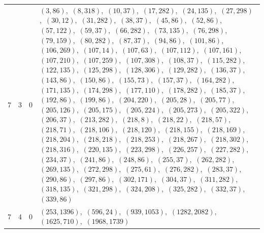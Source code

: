 \documentclass[11pt]{article}
\begin{document}
\begin{longtable}{@{}rrl>{\raggedright\arraybackslash}p{}@{}}
7 & 3 & $0$ & $(3,86)$,\allowbreak\ $(8,318)$,\allowbreak\ $(10,37)$,\allowbreak\ $(17,282)$,\allowbreak\ $(24,135)$,\allowbreak\ $(27,298)$,\allowbreak\ $(30,12)$,\allowbreak\ $(31,282)$,\allowbreak\ $(38,37)$,\allowbreak\ $(45,86)$,\allowbreak\ $(52,86)$,\allowbreak\ $(57,122)$,\allowbreak\ $(59,37)$,\allowbreak\ $(66,282)$,\allowbreak\ $(73,135)$,\allowbreak\ $(76,298)$,\allowbreak\ $(79,159)$,\allowbreak\ $(80,282)$,\allowbreak\ $(87,37)$,\allowbreak\ $(94,86)$,\allowbreak\ $(101,86)$,\allowbreak\ $(106,269)$,\allowbreak\ $(107,14)$,\allowbreak\ $(107,63)$,\allowbreak\ $(107,112)$,\allowbreak\ $(107,161)$,\allowbreak\ $(107,210)$,\allowbreak\ $(107,259)$,\allowbreak\ $(107,308)$,\allowbreak\ $(108,37)$,\allowbreak\ $(115,282)$,\allowbreak\ $(122,135)$,\allowbreak\ $(125,298)$,\allowbreak\ $(128,306)$,\allowbreak\ $(129,282)$,\allowbreak\ $(136,37)$,\allowbreak\ $(143,86)$,\allowbreak\ $(150,86)$,\allowbreak\ $(155,73)$,\allowbreak\ $(157,37)$,\allowbreak\ $(164,282)$,\allowbreak\ $(171,135)$,\allowbreak\ $(174,298)$,\allowbreak\ $(177,110)$,\allowbreak\ $(178,282)$,\allowbreak\ $(185,37)$,\allowbreak\ $(192,86)$,\allowbreak\ $(199,86)$,\allowbreak\ $(204,220)$,\allowbreak\ $(205,28)$,\allowbreak\ $(205,77)$,\allowbreak\ $(205,126)$,\allowbreak\ $(205,175)$,\allowbreak\ $(205,224)$,\allowbreak\ $(205,273)$,\allowbreak\ $(205,322)$,\allowbreak\ $(206,37)$,\allowbreak\ $(213,282)$,\allowbreak\ $(218,8)$,\allowbreak\ $(218,22)$,\allowbreak\ $(218,57)$,\allowbreak\ $(218,71)$,\allowbreak\ $(218,106)$,\allowbreak\ $(218,120)$,\allowbreak\ $(218,155)$,\allowbreak\ $(218,169)$,\allowbreak\ $(218,204)$,\allowbreak\ $(218,218)$,\allowbreak\ $(218,253)$,\allowbreak\ $(218,267)$,\allowbreak\ $(218,302)$,\allowbreak\ $(218,316)$,\allowbreak\ $(220,135)$,\allowbreak\ $(223,298)$,\allowbreak\ $(226,257)$,\allowbreak\ $(227,282)$,\allowbreak\ $(234,37)$,\allowbreak\ $(241,86)$,\allowbreak\ $(248,86)$,\allowbreak\ $(255,37)$,\allowbreak\ $(262,282)$,\allowbreak\ $(269,135)$,\allowbreak\ $(272,298)$,\allowbreak\ $(275,61)$,\allowbreak\ $(276,282)$,\allowbreak\ $(283,37)$,\allowbreak\ $(290,86)$,\allowbreak\ $(297,86)$,\allowbreak\ $(302,171)$,\allowbreak\ $(304,37)$,\allowbreak\ $(311,282)$,\allowbreak\ $(318,135)$,\allowbreak\ $(321,298)$,\allowbreak\ $(324,208)$,\allowbreak\ $(325,282)$,\allowbreak\ $(332,37)$,\allowbreak\ $(339,86)$\\
7 & 4 & $0$ & $(253,1396)$,\allowbreak\ $(596,24)$,\allowbreak\ $(939,1053)$,\allowbreak\ $(1282,2082)$,\allowbreak\ $(1625,710)$,\allowbreak\ $(1968,1739)$\\

\end{longtable}
\end{document}
